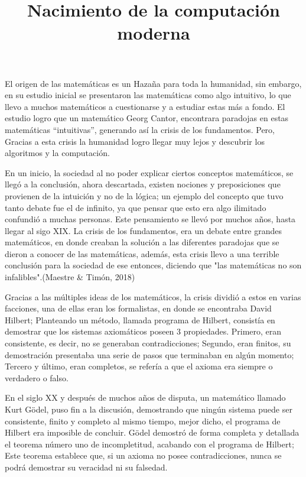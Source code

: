 \documentclass{article}
\title{Nacimiento de la computación moderna}
\date{}
\author{}
\begin{document}
\maketitle

El origen de las matemáticas es un Hazaña para toda la humanidad, sin embargo, en su estudio inicial se presentaron las matemáticas como algo intuitivo, lo que llevo a muchos matemáticos a cuestionarse y a estudiar estas más a fondo. El estudio logro que un matemático Georg Cantor, encontrara paradojas en estas matemáticas “intuitivas”, generando así la crisis de los fundamentos. Pero, Gracias a esta crisis la humanidad logro llegar muy lejos y descubrir los algoritmos y la computación.

En un inicio, la sociedad al no poder explicar ciertos conceptos matemáticos, se llegó a la conclusión, ahora descartada, existen nociones y preposiciones que provienen de la intuición y no de la lógica; un ejemplo del concepto que tuvo tanto debate fue el de infinito, ya que pensar que esto era algo ilimitado confundió a muchas personas. Este pensamiento se llevó por muchos años, hasta llegar al sigo XIX. La crisis de los fundamentos, era un debate entre grandes matemáticos, en donde creaban la solución a las diferentes paradojas que se dieron a conocer de las matemáticas, además, esta crisis llevo a una terrible conclusión para la sociedad de ese entonces, diciendo que "las matemáticas no son infalibles".(Maestre & Timón, 2018)

Gracias a las múltiples ideas de los matemáticos, la crisis dividió a estos en varias facciones, una de ellas eran los formalistas, en donde se encontraba David Hilbert; Planteando un método, llamada programa de Hilbert, consistía en demostrar que los sistemas axiomáticos poseen 3 propiedades. Primero, eran consistente, es decir, no se generaban contradicciones; Segundo, eran finitos, su demostración presentaba una serie de pasos que terminaban en algún momento; Tercero y último, eran completos, se refería a que el axioma era siempre o verdadero o falso.

En el siglo XX y después de muchos años de disputa, un matemático llamado Kurt Gödel, puso fin a la discusión, demostrando que ningún sistema puede ser consistente, finito y completo al mismo tiempo, mejor dicho, el programa de Hilbert era imposible de concluir. Gödel demostró de forma completa y detallada el teorema número uno de incompletitud, acabando con el programa de Hilbert; Este teorema establece que, si un axioma no posee contradicciones, nunca se podrá demostrar su veracidad ni su falsedad.
\end{document}
